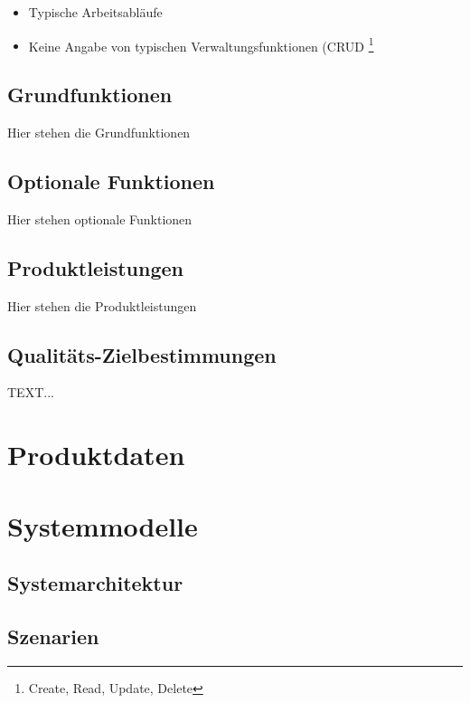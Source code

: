 \documentclass[a4paper]{scrreprt}
\begin{document}
\begin{itemize}
  \item Typische Arbeitsabläufe
  \item Keine Angabe von typischen Verwaltungsfunktionen (CRUD \footnote{Create,
Read, Update, Delete}
\end{itemize}

\section{Grundfunktionen}
Hier stehen die Grundfunktionen

\section{Optionale Funktionen}
Hier stehen optionale Funktionen

\section{Produktleistungen}
Hier stehen die Produktleistungen

\section{Qualitäts-Zielbestimmungen}
TEXT...

\chapter{Produktdaten}

\chapter{Systemmodelle}
\section{Systemarchitektur}
\section{Szenarien}
\end{document}
